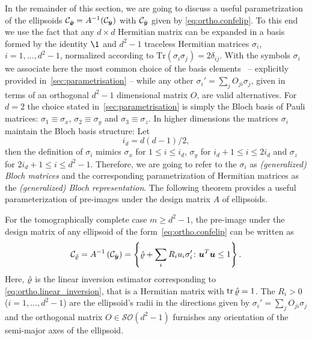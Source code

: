 In the remainder of this section, we are going to discuss a useful parametrization of the ellipsoids $\mathcal{C}_{\hat{\boldsymbol{\varrho}}} = A^{-1}(\mathcal{C}_{\hat{\boldsymbol{y}}})$ with $\mathcal{C}_{\hat{\boldsymbol{y}}}$ given by \cref{eq:ortho.confelip}.
To this end we use the fact that any $d\times d$ Hermitian matrix can be expanded in a basis formed by the identity $\1$ and $d^{2}-1$ traceless Hermitian matrices $\sigma_{i}$, $i=1,\ldots,d^{2}-1$, normalized according to $\textrm{Tr}(\sigma_{i}\sigma_{j})=2\delta_{ij}$.
With the symbols $\sigma_{i}$ we associate here the most common choice of the basis elements~\cite{Kimura_2003_Bloch}  --  explicitly provided in~\ref{sec:parametrisation} -- while any other $\sigma_{i}'=\sum_{j}O_{ji}\sigma_{j}$, given in terms of an orthogonal $d^{2}-1$ dimensional matrix $O$, are valid alternatives.
For $d=2$ the choice stated in~\ref{sec:parametrisation} is simply the Bloch basis of Pauli matrices: $\sigma_{1}\equiv\sigma_{x}$, $\sigma_{2}\equiv\sigma_{y}$ and $\sigma_{3}\equiv\sigma_{z}$.
In higher dimensions the matrices $\sigma_{i}$ maintain the Bloch basis structure:
Let
\[
  \label{eq:ortho.x_yz_index}
  i_{d}=d(d-1)/2,
\]
then the definition of $\sigma_i$ mimics $\sigma_{x}$ for $1\leq i\leq i_{d}$, $\sigma_{y}$ for $i_{d}+1\leq i\leq2i_{d}$ and $\sigma_{z}$ for $2i_{d}+1\leq i\leq d^{2}-1$.
Therefore, we are going to refer to the $\sigma_{i}$ as \emph{(generalized) Bloch matrices} and the corresponding parametrization of Hermitian matrices as the \emph{(generalized) Bloch representation}.
The following theorem provides a useful parameterization of pre-images under the design matrix $A$ of ellipsoids.
\begin{theorem}\label{thm:ortho.ellipsoids}
  For the tomographically complete case $m \geq d^2 - 1$, the pre-image under the design matrix of any ellipsoid of the form~\eqref{eq:ortho.confelip} can be written as
  \[
    \label{eq:ortho.ellipsoid}
    \mathcal{C}_{\hat{\varrho}} = A^{-1}\left( \mathcal{C}_{\hat{\boldsymbol{y}}} \right) = \left\{ \hat{\varrho} + \sum_{i}R_{i}u_{i}\sigma_{i}'\colon \boldsymbol{u}^{T}\boldsymbol{u}\leq1 \right\}.
  \]
  Here, $\hat{\varrho}$ is the linear inversion estimator corresponding to \cref{eq:ortho.linear_inversion}, that is a Hermitian matrix with $\operatorname{tr} \hat{\varrho} = 1$.
  The $R_{i}>0$ ($i=1,\ldots,d^{2}-1$) are the ellipsoid's radii in the directions given by $\sigma_{i}'=\sum_{j}O_{ji}\sigma_{j}$ and the orthogonal matrix $O\in\mathcal{SO}\left(d^{2}-1\right)$ furnishes any orientation of the semi-major axes of the ellipsoid.
\end{theorem}
